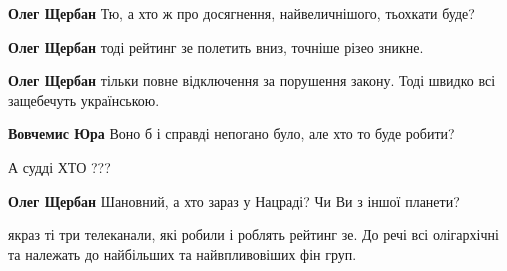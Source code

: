 \begin{itemize}
\begin{itemize}
\textbf{Олег Щербан} Тю, а хто ж про досягнення, найвеличнішого, тьохкати буде?

 
\textbf{Олег Щербан} тоді рейтинг зе полетить вниз, точніше різео зникне.

 
\textbf{Олег Щербан} тільки повне відключення за порушення закону. Тоді швидко всі защебечуть українською.

 
\textbf{Вовчемис Юра} Воно б і справді непогано було, але хто то буде робити?

 
А судді ХТО ???

 
\textbf{Олег Щербан} Шановний, а хто зараз у Нацраді? Чи Ви з іншої планети?
\end{itemize}

 
якраз ті три телеканали, які робили і роблять рейтинг зе. До речі всі олігархічні та належать до найбільших та найвпливовіших фін груп.

 

\end{itemize}
